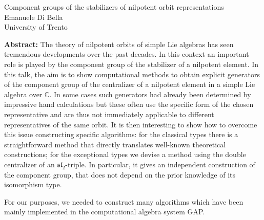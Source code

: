 \documentclass[12pt,a4paper]{article}
\begin{document}
\thispagestyle{empty} 
\begin{center}
{\large  Component groups of the stabilizers of nilpotent orbit representations}\\
\vspace*{.5cm}
Emanuele Di Bella\\
University of Trento\\
\end{center}
\vspace*{.8cm}

{\bf Abstract:} The theory of nilpotent orbits of simple Lie algebras has seen tremendous developments over the past decades. In this context an important role is played by the component group of the stabilizer of a nilpotent element. In this talk, the aim is to show computational methods to obtain explicit generators of the component group of the centralizer of a nilpotent element in a simple Lie algebra over $\mathbb{C}$. In some cases such generators had already been determined by impressive hand calculations but these often use the specific form of the chosen representative and are thus not immediately applicable to different representatives of the same orbit. It is then interesting to show how to overcome this issue constructing specific algorithms: for the classical types there is a straightforward method that directly translates well-known theoretical constructions; for the exceptional types we devise a method using the double centralizer of an $\mathfrak{sl}_2$-triple. In particular, it gives an independent construction of the component group, that does not depend on the prior knowledge of its isomorphism type.


For our purposes, we needed to construct many algorithms which have been mainly implemented in the computational algebra system GAP.
\end{document}
